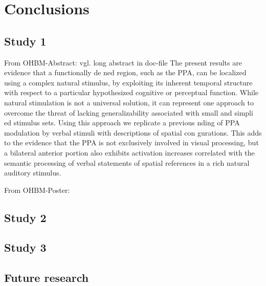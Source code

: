 \section{Conclusions}



\subsection{Study 1}
%
From OHBM-Abstract: vgl. long abstract in doc-file
%
The present results are evidence that a functionally de ned region, such as the
PPA, can be localized using a complex natural stimulus, by exploiting its
inherent temporal structure with respect to a particular hypothesized cognitive
or perceptual function.
%
While natural stimulation is not a universal solution, it can represent one
approach to overcome the threat of lacking generalizability associated with
small and simpli ed stimulus sets.
%
Using this approach we replicate a previous nding of PPA modulation by verbal
stimuli with descriptions of spatial con gurations.
%
This adds to the evidence that the PPA is not exclusively involved in visual
processing, but a bilateral anterior portion also exhibits activation increases
correlated with the semantic processing of verbal statements of spatial
references in a rich natural auditory stimulus.

%
From OHBM-Poster:


\subsection{Study 2}



\subsection{Study 3}



\subsection{Future research}



